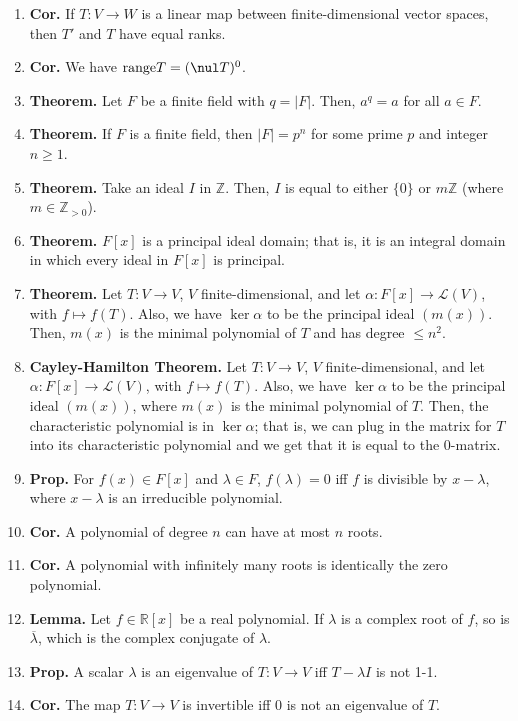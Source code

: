 \begin{enumerate}
	\item \textbf{Cor. } If $T: V \to W$ is a linear map between finite-dimensional vector spaces, then $T'$ and $T$ have equal ranks. 
	\item \textbf{Cor. } We have $\textrm{range}T = (\nul T)^0$. 
	\item \textbf{Theorem. } Let $F$ be a finite field with $q = |F|$. Then, $a^q=a$ for all $a \in F$. 
	\item \textbf{Theorem. } If $F$ is a finite field, then $|F|=p^n$ for some prime $p$ and integer $n \geq 1$. 
	\item \textbf{Theorem. } Take an ideal $I$ in $\mathbb{Z}$. Then, $I$ is equal to either $\{0\}$ or $m\mathbb{Z}$ (where $m \in \mathbb{Z}_{>0}$). 
	\item \textbf{Theorem. } $F[x]$ is a principal ideal domain; that is, it is an integral domain in which every ideal in $F[x]$ is principal. 
	\item \textbf{Theorem. } Let $T: V \to V$, $V$ finite-dimensional, and let $\alpha: F[x] \to \mathscr{L}(V)$, with $f \mapsto f(T)$. Also, we have $\ker\alpha$ to be the principal ideal $(m(x))$. Then, $m(x)$ is the minimal polynomial of $T$ and has degree $\leq n^2$. 
	\item \textbf{Cayley-Hamilton Theorem. } Let $T: V \to V$, $V$ finite-dimensional, and let $\alpha: F[x] \to \mathscr{L}(V)$, with $f \mapsto f(T)$. Also, we have $\ker\alpha$ to be the principal ideal $(m(x))$, where $m(x)$ is the minimal polynomial of $T$. Then, the characteristic polynomial is in $\ker\alpha$; that is, we can plug in the matrix for $T$ into its characteristic polynomial and we get that it is equal to the 0-matrix. 
	\item \textbf{Prop. } For $f(x) \in F[x]$ and $\lambda \in F$, $f(\lambda)=0$ iff $f$ is divisible by $x - \lambda$, where $x-\lambda$ is an irreducible polynomial. 
	\item \textbf{Cor. } A polynomial of degree $n$ can have at most $n$ roots. 	
	\item \textbf{Cor. } A polynomial with infinitely many roots is identically the zero polynomial. 
	\item \textbf{Lemma. } Let $f \in \mathbb{R}[x]$ be a real polynomial. If $\lambda$ is a complex root of $f$, so is $\overline{\lambda}$, which is the complex conjugate of $\lambda$. 
	\item \textbf{Prop. } A scalar $\lambda$ is an eigenvalue of $T: V \to V$ iff $T-\lambda I$ is not 1-1. 
	\item \textbf{Cor. } The map $T: V \to V$ is invertible iff 0 is not an eigenvalue of $T$. 

\end{enumerate}
